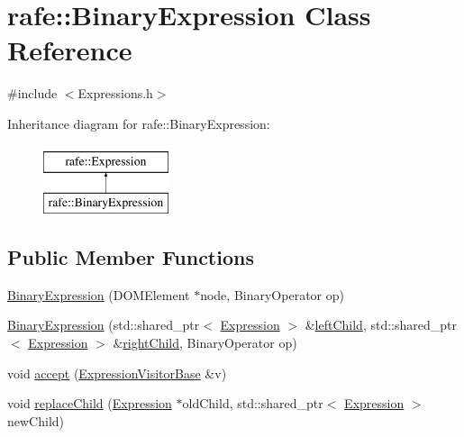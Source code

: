 \hypertarget{classrafe_1_1_binary_expression}{\section{rafe\+:\+:Binary\+Expression Class Reference}
\label{classrafe_1_1_binary_expression}
}


{\ttfamily \#include $<$Expressions.\+h$>$}

Inheritance diagram for rafe\+:\+:Binary\+Expression\+:\begin{figure}[H]
\begin{center}
\leavevmode
\includegraphics[height=2.000000cm]{classrafe_1_1_binary_expression}
\end{center}
\end{figure}
\subsection*{Public Member Functions}
\begin{DoxyCompactItemize}
\item 
\hyperlink{classrafe_1_1_binary_expression_a28a843c17e363547740ab7bdbc23c7f9}{Binary\+Expression} (D\+O\+M\+Element $\ast$node, Binary\+Operator op)
\item 
\hyperlink{classrafe_1_1_binary_expression_acd2ee559a5dfb360d8fab62186b8fbce}{Binary\+Expression} (std\+::shared\+\_\+ptr$<$ \hyperlink{classrafe_1_1_expression}{Expression} $>$ \&\hyperlink{classrafe_1_1_binary_expression_a1c428205f0d4d597a6307e7cab39ee21}{left\+Child}, std\+::shared\+\_\+ptr$<$ \hyperlink{classrafe_1_1_expression}{Expression} $>$ \&\hyperlink{classrafe_1_1_binary_expression_ad915f6160c53ad08803e30db1ffc8e1c}{right\+Child}, Binary\+Operator op)
\item 
void \hyperlink{classrafe_1_1_binary_expression_a343b5568f9fa7bf63b1f734bfed65f78}{accept} (\hyperlink{classrafe_1_1_expression_visitor_base}{Expression\+Visitor\+Base} \&v)
\item 
void \hyperlink{classrafe_1_1_binary_expression_ac094c4a5686ded1827d12e14bdfae1c6}{replace\+Child} (\hyperlink{classrafe_1_1_expression}{Expression} $\ast$old\+Child, std\+::shared\+\_\+ptr$<$ \hyperlink{classrafe_1_1_expression}{Expression} $>$ new\+Child)
\end{DoxyCompactItemize}
